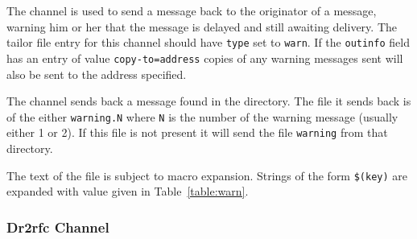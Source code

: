 The  channel is used to send a message back to the
originator of a message, warning him or her that the message is
delayed and still awaiting delivery.
The tailor file entry for this channel should have \verb+type+ set to
\verb+warn+.
If the \verb+outinfo+ field has an entry of value
\verb+copy-to=address+ copies of any warning messages sent will also
be sent to the address specified.

The  channel sends back a message found in the
 directory. The file it sends back is of the either
\verb|warning.N| where \verb|N| is the number of the warning message
(usually either 1 or 2). If this file is not present it will send the
file \verb|warning| from that directory.

The text of the file is subject to macro expansion. Strings of the
form \verb|$(key)| are expanded with value given in
Table~\ref{table:warn}.


\subsubsection	{Dr2rfc Channel}

